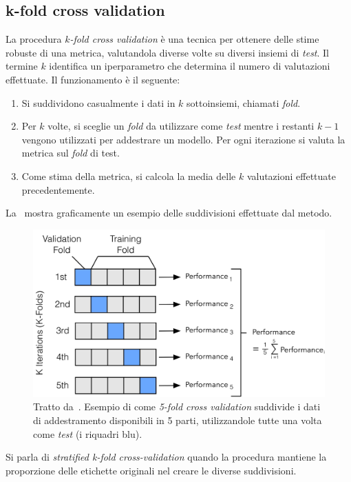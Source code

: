 \subsection{k-fold cross validation}
La procedura $k$\emph{-fold cross validation} è una tecnica per ottenere delle stime robuste di una metrica, valutandola diverse volte su diversi insiemi di \emph{test}.
Il termine $k$ identifica un iperparametro che determina il numero di valutazioni effettuate.
Il funzionamento è il seguente:
\begin{enumerate}
    \item Si suddividono casualmente i dati in $k$ sottoinsiemi, chiamati \emph{fold}.
    \item Per $k$ volte, si sceglie un \emph{fold} da utilizzare come \emph{test} mentre i restanti $k-1$ vengono utilizzati per addestrare un modello. Per ogni iterazione si valuta la metrica sul \emph{fold} di test.
    \item Come stima della metrica, si calcola la media delle $k$ valutazioni effettuate precedentemente.
\end{enumerate}
La~ mostra graficamente un esempio delle suddivisioni effettuate dal metodo.
\begin{figure}
    \centering
    \includegraphics[width=0.7\linewidth]{img/kfoldCV.jpg}
    \caption[Esempio \emph{5-fold cross-validation}.]{Tratto da~\cite{model_evaluation}. Esempio di come \emph{5-fold cross validation} suddivide i dati di addestramento disponibili in 5 parti, utilizzandole tutte una volta come \emph{test} (i riquadri blu).}
    \label{fig:kfoldcv}
\end{figure}
Si parla di \emph{stratified k-fold cross-validation} quando la procedura mantiene la proporzione delle etichette originali nel creare le diverse suddivisioni.


